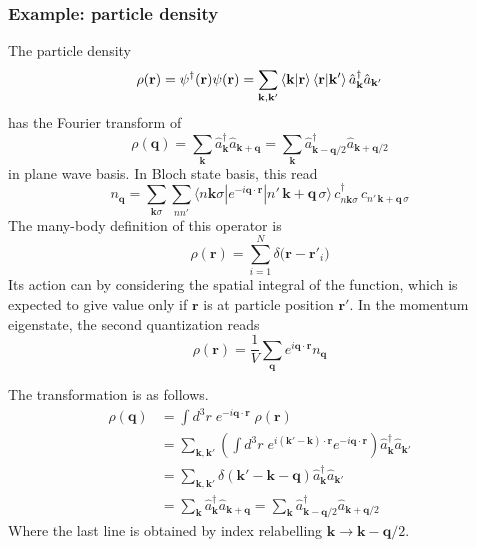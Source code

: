 \documentclass[../../../main.tex]{subfiles}
\begin{document}
\subsubsection{Example: particle density}
The particle density
\begin{equation*}
  \rho(\mathbf{r}) = \psi^\dagger(\mathbf{r})\psi(\mathbf{r}) = \sum_{\mathbf{k},\mathbf{k}'} \braket{\mathbf{k}|\mathbf{r} }\braket{\mathbf{r}|\mathbf{k}'} \hat{a}_\mathbf{k}^\dagger \hat{a}_{\mathbf{k'}}
\end{equation*}
has the Fourier transform of
\begin{equation*}
  \rho(\mathbf{q}) = \sum_{\mathbf{k}} \hat{a}_\mathbf{k}^\dagger \hat{a}_{\mathbf{k}+\mathbf{q}}= \sum_{\mathbf{k}} \hat{a}_{\mathbf{k}-\mathbf{q}/2}^\dagger \hat{a}_{\mathbf{k}+\mathbf{q}/2}
\end{equation*}
in plane wave basis.
In Bloch state basis, this read
\begin{equation*}
  n_{\mathbf{q}} = \sum_{\mathbf{k}\sigma}\sum_{nn'} \langle n\mathbf{k}\sigma|e^{-i\mathbf{q}\cdot\mathbf{r}}|n'\,\mathbf{k}+\mathbf{q}\,\sigma\rangle \, c^{\dagger}_{n\mathbf{k}\sigma}\, c_{n'\,\mathbf{k}+\mathbf{q}\,\sigma}
\end{equation*}
The many-body definition of this operator is
\begin{equation*}
  \rho(\mathbf{r}) = \sum_{i=1}^{N} \delta\bigl(\mathbf{r}-\mathbf{r}'_{i}\bigr)
\end{equation*}
Its action can by considering the spatial integral of the function, which is expected to give value only if $\mathbf{r} $ is at particle position $\mathbf{r}'$.
In the momentum eigenstate, the second quantization reads
\begin{equation*}
  \rho (\mathbf{r}) = \frac{1 }{V }\sum_{\mathbf{q }} e ^{i \mathbf{q }\cdot \mathbf{r }}n _{\mathbf{q}}
\end{equation*}

The transformation is as follows.
\begin{align*}
  \rho(\mathbf{q})
   & = \int d^3r\;e^{-i\mathbf{q}\cdot\mathbf{r}}\;\rho(\mathbf{r})                                                                                                                       \\
   & =  \sum_{\mathbf{k},\mathbf{k}'}\left(\int d^3r\;e^{i(\mathbf{k}'-\mathbf{k})\cdot\mathbf{r}}e^{-i\mathbf{q}\cdot\mathbf{r}}\right) \hat{a}_\mathbf{k}^\dagger \hat{a}_{\mathbf{k}'} \\
   & =  \sum_{\mathbf{k},\mathbf{k}'} \delta (\mathbf{k}'-\mathbf{k}-\mathbf{q})   \hat{a}_\mathbf{k}^\dagger \hat{a}_{\mathbf{k}'}                                                       \\
   & = \sum_{\mathbf{k}} \hat{a}_\mathbf{k}^\dagger \hat{a}_{\mathbf{k}+\mathbf{q}}=
  \sum_{\mathbf{k}} \hat{a}_{\mathbf{k}-\mathbf{q}/2}^\dagger \hat{a}_{\mathbf{k}+\mathbf{q}/2}
\end{align*}
Where the last line is obtained by index relabelling $\mathbf{k} \rightarrow \mathbf{k}-\mathbf{q}/2$.
\end{document}
